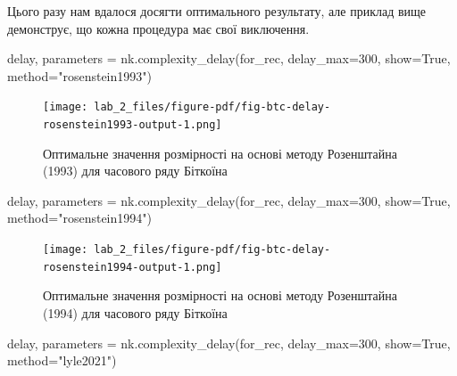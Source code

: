 \documentclass[
  letterpaper,
]{report}
\newenvironment{Shaded}{\begin{snugshade}}{\end{snugshade}}
\newcommand{\DecValTok}[1]{\textcolor[rgb]{0.68,0.00,0.00}{#1}}
\newcommand{\NormalTok}[1]{\textcolor[rgb]{0.00,0.23,0.31}{#1}}
\newcommand{\OperatorTok}[1]{\textcolor[rgb]{0.37,0.37,0.37}{#1}}
\newcommand{\StringTok}[1]{\textcolor[rgb]{0.13,0.47,0.30}{#1}}
\newcommand{\VariableTok}[1]{\textcolor[rgb]{0.07,0.07,0.07}{#1}}
\begin{document}
Цього разу нам вдалося досягти оптимального результату, але приклад вище
демонструє, що кожна процедура має свої виключення.

\begin{Shaded}
\begin{Highlighting}[]
\NormalTok{delay, parameters }\OperatorTok{=}\NormalTok{ nk.complexity\_delay(for\_rec, }
\NormalTok{                                        delay\_max}\OperatorTok{=}\DecValTok{300}\NormalTok{, show}\OperatorTok{=}\VariableTok{True}\NormalTok{,}
\NormalTok{                                        method}\OperatorTok{=}\StringTok{"rosenstein1993"}\NormalTok{)}
\end{Highlighting}
\end{Shaded}

\begin{figure}[H]

{\centering \texttt{[image: lab\_2\_files/figure-pdf/fig-btc-delay-rosenstein1993-output-1.png]}

}

\caption{\label{fig-btc-delay-rosenstein1993}Оптимальне значення
розмірності на основі методу Розенштайна (1993) для часового ряду
Біткоїна}

\end{figure}

\begin{Shaded}
\begin{Highlighting}[]
\NormalTok{delay, parameters }\OperatorTok{=}\NormalTok{ nk.complexity\_delay(for\_rec, }
\NormalTok{                                        delay\_max}\OperatorTok{=}\DecValTok{300}\NormalTok{, show}\OperatorTok{=}\VariableTok{True}\NormalTok{,}
\NormalTok{                                        method}\OperatorTok{=}\StringTok{"rosenstein1994"}\NormalTok{)}
\end{Highlighting}
\end{Shaded}

\begin{figure}[H]

{\centering \texttt{[image: lab\_2\_files/figure-pdf/fig-btc-delay-rosenstein1994-output-1.png]}

}

\caption{\label{fig-btc-delay-rosenstein1994}Оптимальне значення
розмірності на основі методу Розенштайна (1994) для часового ряду
Біткоїна}

\end{figure}

\begin{Shaded}
\begin{Highlighting}[]
\NormalTok{delay, parameters }\OperatorTok{=}\NormalTok{ nk.complexity\_delay(for\_rec, }
\NormalTok{                                        delay\_max}\OperatorTok{=}\DecValTok{300}\NormalTok{, show}\OperatorTok{=}\VariableTok{True}\NormalTok{,}
\NormalTok{                                        method}\OperatorTok{=}\StringTok{"lyle2021"}\NormalTok{)}
\end{Highlighting}
\end{Shaded}
\end{document}
